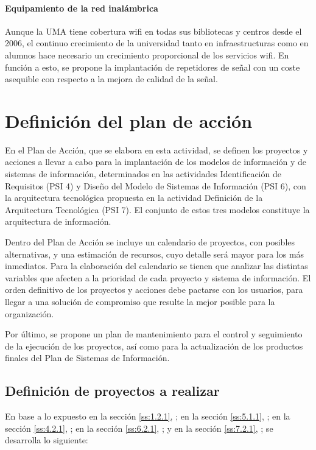 \documentclass[11pt,a4paper,spanish,twoside]{report}
\begin{document}
\subsubsection{Equipamiento de la red inalámbrica}
Aunque la UMA tiene cobertura wifi en todas sus bibliotecas y centros desde
el 2006, el continuo crecimiento de la universidad tanto en infraestructuras
como en alumnos hace necesario un crecimiento proporcional de los servicios
wifi. En función a esto, se propone la implantación de repetidores de señal
con un coste asequible con respecto a la mejora de calidad de la señal.


\chapter{Definición del plan de acción}
En el Plan de Acción, que se elabora en esta actividad, se definen los
proyectos y acciones a llevar a cabo para la implantación de los modelos de
información y de sistemas de información, determinados en las actividades
Identificación de Requisitos (PSI 4) y Diseño del Modelo de Sistemas de
Información (PSI 6), con la arquitectura tecnológica propuesta en la
actividad Definición de la Arquitectura Tecnológica (PSI 7). El conjunto de
estos tres modelos constituye la arquitectura de información. 

Dentro del Plan de Acción se incluye un calendario de proyectos, con posibles 
alternativas, y una estimación de recursos, cuyo detalle será mayor para los 
más inmediatos. Para la elaboración del calendario se tienen que analizar las
distintas variables que afecten a la prioridad de cada proyecto y sistema de
información. El orden definitivo de los proyectos y acciones debe pactarse
con los usuarios, para llegar a una solución de compromiso que resulte la
mejor posible para la organización. 

Por último, se propone un plan de mantenimiento para el control y seguimiento 
de la ejecución de los proyectos, así como para la actualización de los 
productos finales del Plan de Sistemas de Información. 

\section{Definición de proyectos a realizar}
En base a lo expuesto 
en la sección \vref{ss:1.2.1}, \emph{}; 
en la sección \vref{ss:5.1.1}, \emph{}; 
en la sección \vref{ss:4.2.1}, \emph{}; 
en la sección \vref{ss:6.2.1}, \emph{}; y
en la sección \vref{ss:7.2.1}, \emph{}; 
se desarrolla lo siguiente:
\end{document}
